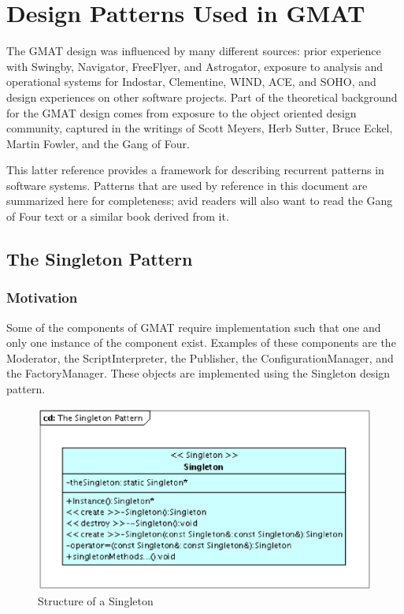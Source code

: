 \chapter{\label{chapter:Patterns}Design Patterns Used in GMAT}

The GMAT design was influenced by many different sources: prior experience with Swingby, Navigator,
FreeFlyer, and Astrogator, exposure to analysis and operational systems for Indostar, Clementine,
WIND, ACE, and SOHO, and design experiences on other software projects.  Part of the theoretical
background for the GMAT design comes from exposure to the object oriented design community,
captured in the writings of Scott Meyers, Herb Sutter, Bruce Eckel, Martin Fowler, and the Gang of
Four\cite{GoF}.

This latter reference provides a framework for describing recurrent patterns in software systems.
Patterns that are used by reference in this document are summarized here for completeness; avid
readers will also want to read the Gang of Four text or a similar book derived from it.

\section{\label{section:TheSingletonPattern}The Singleton Pattern}

\subsection{Motivation}
Some of the components of GMAT require implementation such that one and only one instance of the
component exist.  Examples of these components are the Moderator, the ScriptInterpreter, the
Publisher, the ConfigurationManager, and the FactoryManager.  These objects are implemented using
the Singleton design pattern.

\begin{figure}[htb]
\begin{center}
\includegraphics[scale=0.5]{Images/TheSingletonPattern.eps}
\caption{\label{figure:TheSingletonPattern}Structure of a Singleton}
\end{center}
\end{figure}

